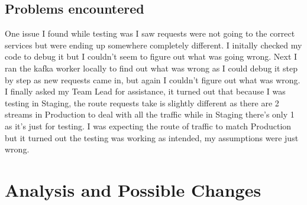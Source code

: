 \subsection{Problems encountered}
One issue I found while testing was I saw requests were not going to the correct services but were ending up somewhere completely different.  I initally checked my code to debug it but I couldn't seem to figure out what was going wrong.  Next I ran the kafka worker locally to find out what was wrong as I could debug it step by step as new requests came in, but again I couldn't figure out what was wrong.  I finally asked my Team Lead for assistance,  it turned out that because I was testing in Staging,  the route requests take is slightly different as there are 2 streams in Production to deal with all the traffic while in Staging there's only 1 as it's just for testing.  I was expecting the route of traffic to match Production but it turned out the testing was working as intended,  my assumptions were just wrong. 
\section{Analysis and Possible Changes}
